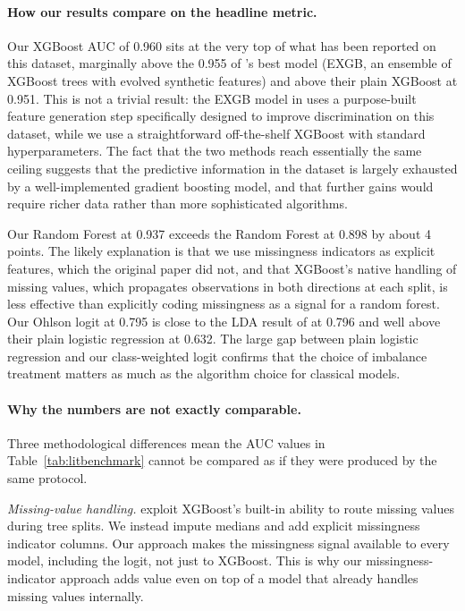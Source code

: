 \documentclass[12pt,a4paper]{article}
\begin{document}
\paragraph{How our results compare on the headline metric.}

Our XGBoost AUC of 0.960 sits at the very top of what has been reported on this
dataset, marginally above the 0.955 of \cite{zieba2016}'s best model (EXGB, an
ensemble of XGBoost trees with evolved synthetic features) and above their plain
XGBoost at 0.951. This is not a trivial result: the EXGB model in
\cite{zieba2016} uses a purpose-built feature generation step specifically
designed to improve discrimination on this dataset, while we use a
straightforward off-the-shelf XGBoost with standard hyperparameters. The fact
that the two methods reach essentially the same ceiling suggests that the
predictive information in the dataset is largely exhausted by a well-implemented
gradient boosting model, and that further gains would require richer data rather
than more sophisticated algorithms.

Our Random Forest at 0.937 exceeds the \cite{zieba2016} Random Forest at 0.898
by about 4 points. The likely explanation is that we use missingness indicators
as explicit features, which the original paper did not, and that XGBoost's
native handling of missing values, which propagates observations in both
directions at each split, is less effective than explicitly coding missingness
as a signal for a random forest. Our Ohlson logit at 0.795 is close to the LDA
result of \cite{zieba2016} at 0.796 and well above their plain logistic
regression at 0.632. The large gap between plain logistic regression and our
class-weighted logit confirms that the choice of imbalance treatment matters as
much as the algorithm choice for classical models.

\paragraph{Why the numbers are not exactly comparable.}

Three methodological differences mean the AUC values in Table~\ref{tab:litbenchmark}
cannot be compared as if they were produced by the same protocol.

\emph{Missing-value handling.} \cite{zieba2016} exploit XGBoost's built-in
ability to route missing values during tree splits. We instead impute medians
and add explicit missingness indicator columns. Our approach makes the
missingness signal available to every model, including the logit, not just to
XGBoost. This is why our missingness-indicator approach adds value even on top
of a model that already handles missing values internally.
\end{document}

